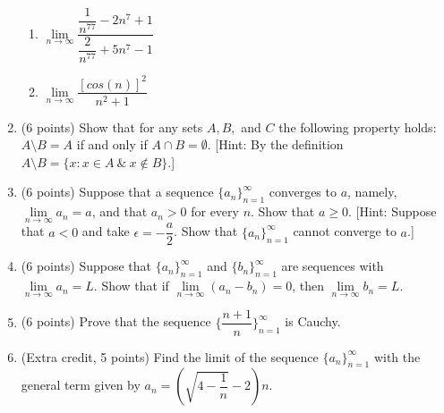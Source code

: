\documentclass[fleqn]{article}
\begin{document}
\begin{enumerate}
\begin{enumerate}



      \item $\lim\limits_{n\to\infty} \dfrac{\dfrac{1}{n^77}-2n^7+1}{\dfrac{2}{n^77}+5n^7-1}$
    


      \item $\lim\limits_{n\to\infty} \dfrac{\left[cos(n)\right]^2}{n^2+1}$



    \end{enumerate}
    

    \item (6 points) Show that for any sets $A, B,$ and $C$ the following property holds: 
    $A \setminus B=A$ if and only if $A \cap B=\emptyset$. 
    [Hint: By the definition $A \setminus B=\{x: x \in A ~ \& ~ x \notin B\}$.]




    \item (6 points) Suppose that a sequence $\{a_n\}_{n=1}^{\infty}$ converges to $a$, namely,
    $\lim\limits_{n\to\infty} a_n=a$, and that $a_n>0$ for every $n$. Show that $a\geq 0$. 
    [Hint: Suppose that $a<0$ and take $\epsilon=-\dfrac{a}{2}$. Show that $\{a_n\}_{n=1}^{\infty}$ cannot converge to $a$.]




    \item (6 points) Suppose that $\{a_n\}_{n=1}^{\infty}$ and $\{b_n\}_{n=1}^{\infty}$ are sequences with $\lim\limits_{n\to\infty} a_n=L$.
    Show that if $\lim\limits_{n\to\infty} (a_n-b_n)=0$, then $\lim\limits_{n\to\infty} b_n=L$.



    \item (6 points) Prove that the sequence $\{\dfrac{n+1}{n}\}_{n=1}^{\infty}$ is Cauchy.




    \item (Extra credit, 5 points) Find the limit of the sequence $\{a_n\}_{n=1}^{\infty}$ with the general term given by 
    $a_n=\left(\sqrt{4-\dfrac{1}{n}}-2\right)n$.



  \end{enumerate}
\end{document}
